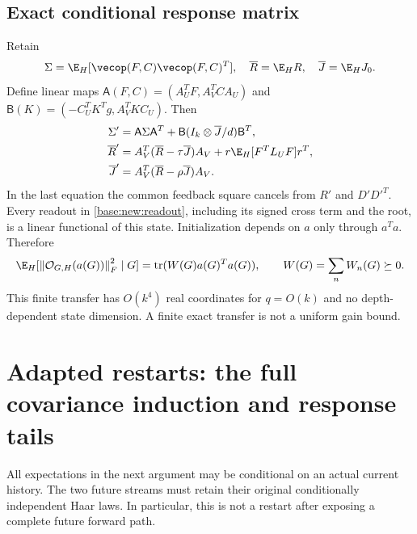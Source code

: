 \documentclass[11pt,oneside,openany,a4paper]{book}
\numberwithin{equation}{chapter}
\theoremstyle{definition}
\theoremstyle{remark}
\newcommand{\F}[1]{\left\lVert#1\right\rVert_F}
\DeclareMathOperator{\tr}{tr}\DeclareMathOperator{\rank}{rank}
\begin{document}
\subsection{Exact conditional response matrix}
Retain
\[
 \Sigma=\E_H[\vecop(F,C)\vecop(F,C)^T],\quad\overline R=\E_HR,
 \quad\overline J=\E_HJ_0.
\]
Define linear maps $\mathsf A(F,C)=(A_U^TF,A_V^TCA_U)$ and
$\mathsf B(K)=(-C_U^TK^Tg,A_V^TKC_U)$. Then
\begin{align}
 \Sigma'&=\mathsf A\Sigma\mathsf A^T+
 \mathsf B(I_k\otimes\overline J/d)\mathsf B^T,\label{base:new:sig-update}\\
 \overline R'&=A_V^T(\overline R-\tau\overline J)A_V+
 r\E_H[F^TL_UF]r^T,\\
 \overline J'&=A_V^T(\overline R-\rho\overline J)A_V.\label{base:new:J-update}
\end{align}
In the last equation the common feedback square cancels from $R'$ and $D'D'^T$. Every readout in \eqref{base:new:readout}, including its signed cross term and the root, is a linear functional of this state. Initialization depends on $a$ only through $a^Ta$. Therefore
\begin{equation}\label{base:new:W}
 \E_H[\F{\mathcal O_{G,H}(a(G))}^2\mid G]
 =\tr(W(G)a(G)^Ta(G)),\qquad W(G)=\sum_nW_n(G)\succeq0.
\end{equation}
This finite transfer has $O(k^4)$ real coordinates for $q=O(k)$ and no depth-dependent state dimension. A finite exact transfer is not a uniform gain bound.

\section{Adapted restarts: the full covariance induction and response tails}\label{base:new:carleson}
All expectations in the next argument may be conditional on an actual current history. The two future streams must retain their original conditionally independent Haar laws. In particular, this is not a restart after exposing a complete future forward path.
\end{document}
